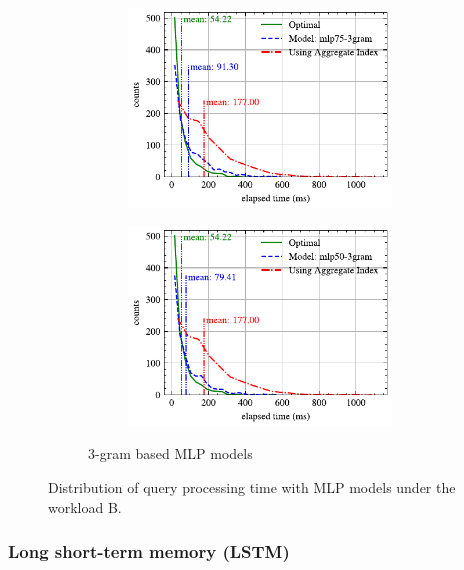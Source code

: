 \begin{figure}[!th]
\begin{subfigure}{0.45\textwidth}
\begin{subfigure}{\textwidth}
			\includegraphics[]{my/graphics/perf_dist_mlp75_3gram_B.pdf}
		\end{subfigure}
		\vfill
		\begin{subfigure}{\textwidth}
			\centering
			\includegraphics[]{my/graphics/perf_dist_mlp50_3gram_B.pdf}
		\end{subfigure}
		\caption{3-gram based MLP models}
	\end{subfigure}
	\caption{Distribution of query processing time with MLP models under the workload B.}
	\label{fig:mlp_perf_all_B}
\end{figure}

\subsubsection{Long short-term memory (LSTM)}


